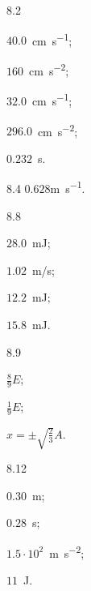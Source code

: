 \protect \section *{\protect {}}
\begin{Solution}{8.{2}}
		\begin{enumerate*}[label=(\alph*)]
		\item $40.0$~\si{\centi\meter\per\second};
		\item $160$~\si{\centi\meter\per\square\second};
		\item $32.0$~\si{\centi\meter\per\second};
		\item $296.0$~\si{\centi\meter\per\square\second};
		\item $0.232$~s.
		\end{enumerate*}
	
\end{Solution}
\begin{Solution}{8.{4}}
		$0.628$\si{\meter\per\second}.
	
\end{Solution}
\begin{Solution}{8.{8}}
		\begin{enumerate*}[label=(\alph*)]
			\item $28.0$~mJ;
			\item $1.02$~m/s;
			\item $12.2$~mJ;
			\item $15.8$~mJ.
		\end{enumerate*}
	
\end{Solution}
\begin{Solution}{8.{9}}
		\begin{enumerate*}[label=(\alph*)]
			\item $\frac{8}{9} E$;
			\item $\frac{1}{9} E$;
			\item $x = \pm \sqrt{\frac23} A$.
		\end{enumerate*}
	
\end{Solution}
\begin{Solution}{8.{12}}
		\begin{enumerate*}[label=(\alph*)]
			\item $0.30$~m;
			\item $0.28$~s;
			\item $1.5 \cdot 10^2$~\si{\meter\per\square\second};
			\item $11$~J.
		\end{enumerate*}
	
\end{Solution}
